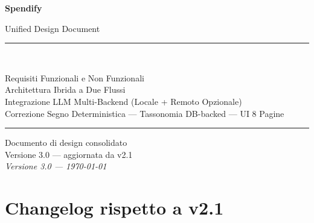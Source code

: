 \documentclass[11pt, a4paper]{article}
\begin{document}

\begin{titlepage}
  \centering
  \vspace*{2cm}
  {\Huge\bfseries\color{primary} Spendify\par}
  \vspace{0.5cm}
  {\Large\color{accent} Unified Design Document\par}
  \vspace{2cm}
  \rule{0.6\linewidth}{0.4pt}\\[1em]
  {\large Requisiti Funzionali e Non Funzionali\\[0.3em]
   Architettura Ibrida a Due Flussi\\[0.3em]
   Integrazione LLM Multi-Backend (Locale + Remoto Opzionale)\\[0.3em]
   Correzione Segno Deterministica --- Tassonomia DB-backed --- UI 8 Pagine\par}
  \rule{0.6\linewidth}{0.4pt}
  \vfill
  {\normalsize Documento di design consolidato\\[0.5em]
   Versione 3.0 --- aggiornata da v2.1\\[0.5em]
   \textit{Versione 3.0 --- \today}}
  \vspace{1.5cm}
\end{titlepage}

\section*{Changelog rispetto a v2.1}
\end{document}
